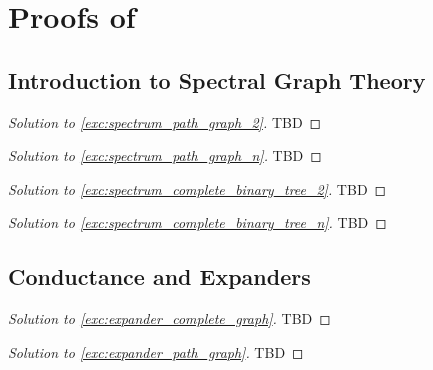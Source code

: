 
\chapter{Proofs of }

\section{Introduction to Spectral Graph Theory}

\begin{proof}[Solution to \cref{exc:spectrum_path_graph_2}] TBD
\end{proof}

\begin{proof}[Solution to \cref{exc:spectrum_path_graph_n}] TBD
\end{proof}

\begin{proof}[Solution to \cref{exc:spectrum_complete_binary_tree_2}] TBD
\end{proof}

\begin{proof}[Solution to \cref{exc:spectrum_complete_binary_tree_n}] TBD
\end{proof}

\section{Conductance and Expanders}

\begin{proof}[Solution to \cref{exc:expander_complete_graph}] TBD
\end{proof}

\begin{proof}[Solution to \cref{exc:expander_path_graph}] TBD
\end{proof}